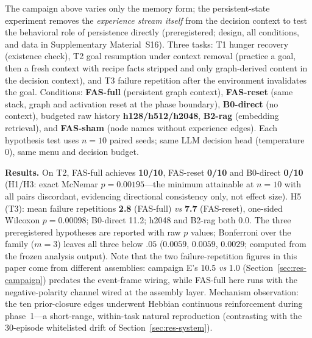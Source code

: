 \documentclass[10pt,a4paper]{article}
\begin{document}
The campaign above varies only the memory form; the persistent-state
experiment removes the \emph{experience stream itself} from the
decision context to test the behavioral role of persistence directly
(preregistered; design, all conditions, and data in Supplementary
Material~S16). Three tasks: T1 hunger recovery (existence check), T2
goal resumption under context removal (practice a goal, then a fresh
context with recipe facts stripped and only graph-derived content in
the decision context), and T3 failure repetition after the environment
invalidates the goal. Conditions: \textbf{FAS-full} (persistent graph
context), \textbf{FAS-reset} (same stack, graph and activation reset at
the phase boundary), \textbf{B0-direct} (no context), budgeted raw
history \textbf{h128/h512/h2048}, \textbf{B2-rag} (embedding
retrieval), and \textbf{FAS-sham} (node names without experience
edges). Each hypothesis test uses $n{=}10$ paired seeds; same LLM
decision head (temperature 0), same menu and decision budget.

\textbf{Results.} On T2, FAS-full achieves \textbf{10/10}, FAS-reset
\textbf{0/10} and B0-direct \textbf{0/10} (H1/H3: exact McNemar
$p{=}0.00195$---the minimum attainable at $n{=}10$ with all pairs
discordant, evidencing directional consistency only, not effect size).
H5 (T3): mean failure repetitions \textbf{2.8} (FAS-full) \emph{vs}
\textbf{7.7} (FAS-reset), one-sided Wilcoxon $p{=}0.00098$;
B0-direct 11.2; h2048 and B2-rag both 0.0. The three preregistered
hypotheses are reported with raw $p$ values; Bonferroni over the
family ($m{=}3$) leaves all three below $.05$
($0.0059$, $0.0059$, $0.0029$; computed from the frozen analysis
output). Note that the two failure-repetition figures in this paper
come from different assemblies: campaign E's 10.5 \emph{vs} 1.0
(Section~\ref{sec:res-campaign}) predates the event-frame wiring, while
FAS-full here runs with the negative-polarity channel wired at the
assembly layer. Mechanism observation: the
ten prior-closure edges underwent Hebbian continuous reinforcement
during phase~1---a short-range, within-task natural reproduction
(contrasting with the 30-episode whitelisted drift of
Section~\ref{sec:res-system}).
\end{document}
